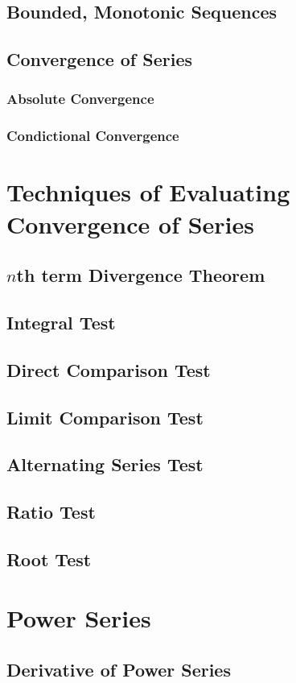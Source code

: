 \documentclass[a4paper]{article}
\begin{document}
  \subsection{Bounded, Monotonic Sequences}
  \subsection{Convergence of Series}
  \subsubsection{Absolute Convergence}
  \subsubsection{Condictional Convergence}
  \section{Techniques of Evaluating Convergence of Series} 
  \subsection[Divergence Theorem]{$n$th term Divergence Theorem}
  \subsection{Integral Test}
  \subsection{Direct Comparison Test}
  \subsection{Limit Comparison Test}
  \subsection{Alternating Series Test}
  \subsection{Ratio Test}
  \subsection{Root Test}
  \section{Power Series} 
  \subsection{Derivative of Power Series}
\end{document}
